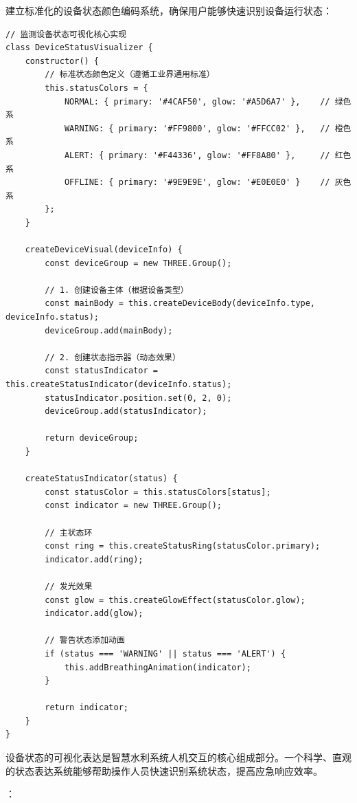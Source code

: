 
建立标准化的设备状态颜色编码系统，确保用户能够快速识别设备运行状态：

\begin{lstlisting}[style=javascript]
// 监测设备状态可视化核心实现
class DeviceStatusVisualizer {
    constructor() {
        // 标准状态颜色定义（遵循工业界通用标准）
        this.statusColors = {
            NORMAL: { primary: '#4CAF50', glow: '#A5D6A7' },    // 绿色系
            WARNING: { primary: '#FF9800', glow: '#FFCC02' },   // 橙色系  
            ALERT: { primary: '#F44336', glow: '#FF8A80' },     // 红色系
            OFFLINE: { primary: '#9E9E9E', glow: '#E0E0E0' }    // 灰色系
        };
    }
    
    createDeviceVisual(deviceInfo) {
        const deviceGroup = new THREE.Group();
        
        // 1. 创建设备主体（根据设备类型）
        const mainBody = this.createDeviceBody(deviceInfo.type, deviceInfo.status);
        deviceGroup.add(mainBody);
        
        // 2. 创建状态指示器（动态效果）
        const statusIndicator = this.createStatusIndicator(deviceInfo.status);
        statusIndicator.position.set(0, 2, 0);
        deviceGroup.add(statusIndicator);
        
        return deviceGroup;
    }
    
    createStatusIndicator(status) {
        const statusColor = this.statusColors[status];
        const indicator = new THREE.Group();
        
        // 主状态环
        const ring = this.createStatusRing(statusColor.primary);
        indicator.add(ring);
        
        // 发光效果
        const glow = this.createGlowEffect(statusColor.glow);
        indicator.add(glow);
        
        // 警告状态添加动画
        if (status === 'WARNING' || status === 'ALERT') {
            this.addBreathingAnimation(indicator);
        }
        
        return indicator;
    }
}
\end{lstlisting}


设备状态的可视化表达是智慧水利系统人机交互的核心组成部分。一个科学、直观的状态表达系统能够帮助操作人员快速识别系统状态，提高应急响应效率。

：

